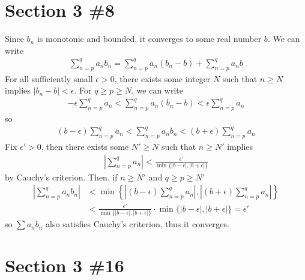 \documentclass{scrartcl}
\begin{document}
\section{Section 3 \#8}
Since \(b_n\) is monotonic and bounded, it converges to some real number \(b\).
We can write
\begin{align*}
  \sum^q_{n = p} a_n b_n = \sum^q_{n = p} a_n (b_n - b) + \sum^q_{n = p} a_n b
\end{align*}
For all sufficiently small \(\epsilon > 0\), there exists some integer \(N\) such that \(n \geq N\) implies \(|b_n - b| < \epsilon\).
For \(q \geq p \geq N\), we can write
\begin{align*}
  -\epsilon \sum^q_{n = p} a_n < \sum^q_{n = p} a_n (b_n - b) < \epsilon \sum^q_{n = p} a_n
\end{align*}
so
\begin{align*}
  (b - \epsilon) \sum^q_{n = p} a_n < \sum^q_{n = p} a_n b_n < (b + \epsilon) \sum^q_{n = p} a_n
\end{align*}
Fix \(\epsilon' > 0\), then there exists some \(N' \geq N\) such that \(n \geq N'\) implies
\begin{align*}
  \left| \sum^q_{n = p} a_n \right| < \frac{\epsilon'}{\min \{|b - \epsilon|, |b + \epsilon|\}}
\end{align*}
by Cauchy's criterion.
Then, if \(n \geq N'\) and \(q \geq p \geq N'\)
\begin{align*}
  \left| \sum^q_{n = p} a_n b_n \right| &< \min \left\{ \left| (b - \epsilon) \sum^q_{n = p} a_n \right|, \left| (b + \epsilon) \sum^q_{n = p} a_n \right| \right\} \\
                                        &< \frac{\epsilon'}{\min \{|b - \epsilon|, |b + \epsilon|\}} \cdot \min \{|b - \epsilon|, |b + \epsilon|\} = \epsilon'
\end{align*}
so \(\sum a_n b_n\) also satisfies Cauchy's criterion, thus it converges.

\section{Section 3 \#16}
\end{document}
